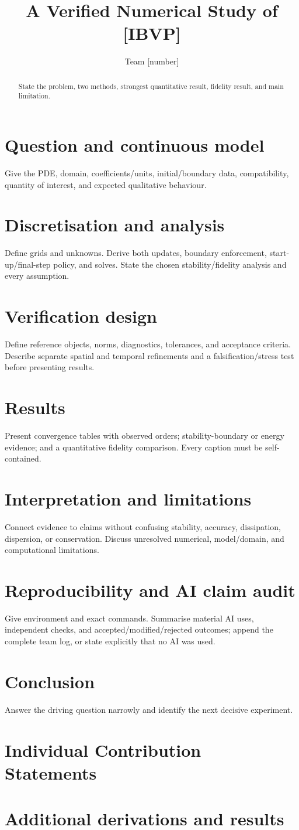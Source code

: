 \documentclass[11pt]{article}\usepackage[a4paper,margin=2cm]{geometry}\usepackage{amsmath,booktabs,graphicx,hyperref}
\title{A Verified Numerical Study of [IBVP]}\author{Team [number]}\date{}
\begin{document}
\maketitle
\begin{abstract}State the problem, two methods, strongest quantitative result, fidelity result, and main limitation.\end{abstract}
\section{Question and continuous model}
Give the PDE, domain, coefficients/units, initial/boundary data, compatibility, quantity of interest, and expected qualitative behaviour.
\section{Discretisation and analysis}
Define grids and unknowns. Derive both updates, boundary enforcement, start-up/final-step policy, and solves. State the chosen stability/fidelity analysis and every assumption.
\section{Verification design}
Define reference objects, norms, diagnostics, tolerances, and acceptance criteria. Describe separate spatial and temporal refinements and a falsification/stress test before presenting results.
\section{Results}
Present convergence tables with observed orders; stability-boundary or energy evidence; and a quantitative fidelity comparison. Every caption must be self-contained.
\section{Interpretation and limitations}
Connect evidence to claims without confusing stability, accuracy, dissipation, dispersion, or conservation. Discuss unresolved numerical, model/domain, and computational limitations.
\section{Reproducibility and AI claim audit}
Give environment and exact commands. Summarise material AI uses, independent checks, and accepted/modified/rejected outcomes; append the complete team log, or state explicitly that no AI was used.
\section{Conclusion}
Answer the driving question narrowly and identify the next decisive experiment.
\appendix\section{Individual Contribution Statements}\section{Additional derivations and results}
\end{document}

